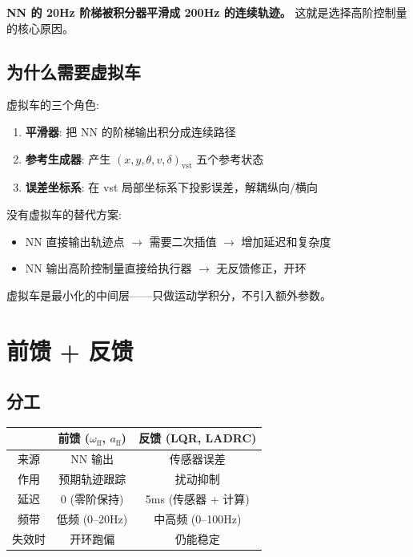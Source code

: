 \documentclass[11pt,a4paper]{article}
\begin{document}
\textbf{NN 的 20Hz 阶梯被积分器平滑成 200Hz 的连续轨迹。} 这就是选择高阶控制量的核心原因。

\subsection{为什么需要虚拟车}

虚拟车的三个角色:

\begin{enumerate}
\item \textbf{平滑器}: 把 NN 的阶梯输出积分成连续路径
\item \textbf{参考生成器}: 产生 $(x,y,\theta,v,\delta)_{\text{vst}}$ 五个参考状态
\item \textbf{误差坐标系}: 在 vst 局部坐标系下投影误差，解耦纵向/横向
\end{enumerate}

没有虚拟车的替代方案:
\begin{itemize}
\item NN 直接输出轨迹点 $\to$ 需要二次插值 $\to$ 增加延迟和复杂度
\item NN 输出高阶控制量直接给执行器 $\to$ 无反馈修正，开环
\end{itemize}

虚拟车是最小化的中间层——只做运动学积分，不引入额外参数。

\section{前馈 + 反馈}

\subsection{分工}

\begin{center}
\begin{tabular}{c|c|c}
\toprule
& 前馈 ($\omega_{\text{ff}}$, $a_{\text{ff}}$) & 反馈 (LQR, LADRC) \\
\midrule
来源 & NN 输出 & 传感器误差 \\
作用 & 预期轨迹跟踪 & 扰动抑制 \\
延迟 & 0 (零阶保持) & 5ms (传感器 + 计算) \\
频带 & 低频 (0--20Hz) & 中高频 (0--100Hz) \\
失效时 & 开环跑偏 & 仍能稳定 \\
\bottomrule
\end{tabular}
\end{center}
\end{document}
